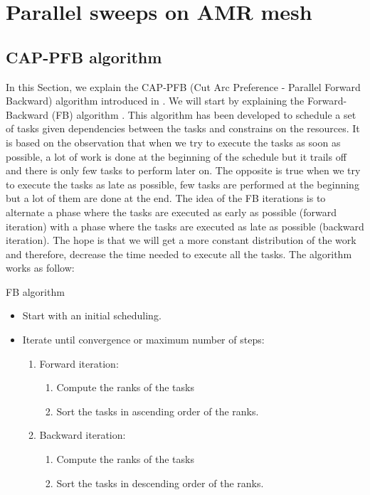 \documentclass[letterpaper]{article}
\renewcommand{\(}{\left(}
\renewcommand{\)}{\right)}
\renewcommand{\[}{\left[}
\renewcommand{\]}{\right]}
\begin{document}
\section{Parallel sweeps on AMR mesh} \label{parallel_sweeps}
\subsection{CAP-PFB algorithm}
In this Section, we explain the CAP-PFB (Cut Arc Preference - Parallel Forward
Backward) algorithm introduced in \cite{Mo2014}. We will start by
explaining the Forward-Backward (FB) algorithm \cite{Li1992}. This algorithm has
been developed to schedule a set of tasks given dependencies between the tasks
and constrains on the resources. It is based on the 
observation that when we try to execute the tasks as soon as possible, a lot of
work is done at the beginning of the schedule but it trails off and there is only few tasks to
perform later on. The opposite is true when we try
to execute the tasks as late as possible, few tasks are performed at the beginning but a
lot of them are done at the end. The idea of the FB iterations is 
to alternate a phase where the tasks are executed as early as possible (forward
iteration) with a phase where the tasks are executed as late as possible
(backward iteration). The hope is that we will get a more constant distribution
of the work and therefore, decrease the time needed to execute all the tasks. The algorithm works 
as follow:
\begin{algorithm}[H]
  \caption{FB algorithm}
  \begin{itemize}
    \item Start with an initial scheduling.
    \item Iterate until convergence or maximum number of steps:
      \begin{enumerate}
        \item Forward iteration:
          \begin{enumerate}
            \item Compute the ranks of the tasks
            \item Sort the tasks in ascending order of the ranks.
          \end{enumerate}
        \item Backward iteration:
          \begin{enumerate}
            \item Compute the ranks of the tasks
            \item Sort the tasks in descending order of the ranks.
          \end{enumerate}
      \end{enumerate}
  \end{itemize}
\end{algorithm}
\end{document}

